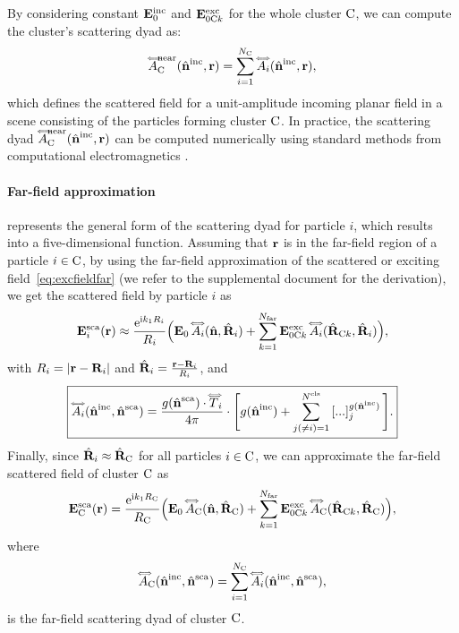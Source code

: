 By considering constant $\mathbf{E}^\mathrm{inc}_0$ and $\mathbf{E}^\mathrm{exc}_{0\mathrm{C} k}$ for the whole cluster $\mathrm{C}$, we can compute the cluster's scattering dyad as:
\begin{equation}
    {\accentset{\Longleftrightarrow}{A}}_{\mathrm{C}}^\text{near}({\hat{\mathbf{n}}}^\mathrm{inc},\mathbf{r}) = \sum_{i=1}^{N_{\mathrm{C}}} {\accentset{\Longleftrightarrow}{A}}_i({\hat{\mathbf{n}}}^\mathrm{inc},\mathbf{r}),
    \label{eq:scatdyadcluster_near}
\end{equation}
which defines the scattered field for a unit-amplitude incoming planar field in a scene consisting of the particles forming cluster $\mathrm{C}$.
In practice, the scattering dyad ${\accentset{\Longleftrightarrow}{A}}_{\mathrm{C}}^\text{near}({\hat{\mathbf{n}}}^\mathrm{inc},\mathbf{r})$ can be computed numerically using standard methods from computational electromagnetics \cite{mishchenko2014electromagnetic}.


\paragraph{Far-field approximation}
 represents the general form of the scattering dyad for particle $i$, which results into a five-dimensional function. Assuming that $\mathbf{r}$ is in the far-field region of a particle $i\in\mathrm{C}$, by using the far-field approximation of the scattered or exciting field~\eqref{eq:excfieldfar} (we refer to the supplemental document for the derivation), we get the scattered field by particle $i$ as
\begin{align}
    \mathbf{E}^\mathrm{sca}_i(\mathbf{r}) \approx \frac{\mathrm{e}^{\mathrm{i} k_1 R_i}}{R_i} \Big(\mathbf{E}_0 \,  {\accentset{\Longleftrightarrow}{A}}_i(\hat{\mathbf{n}},\hat{\mathbf{R}}_i) 
    + \sum_{k=1}^{N_\mathrm{far}} \mathbf{E}^\mathrm{exc}_{0\mathrm{C} k} \, {\accentset{\Longleftrightarrow}{A}}_i(\hat{\mathbf{R}}_{\mathrm{C} k},\hat{\mathbf{R}}_i) \Big),
    \label{eq:farscatfield}
\end{align}
with $R_i=|\mathbf{r}-\mathbf{R}_i|$ and $\hat{\mathbf{R}}_i=\frac{\mathbf{r}-\mathbf{R}_i}{R_i}$, and
\begin{equation}
    \label{eq:farscatdyad}
    \boxed{%
        \dyad{A}_i(\hatbfnis) = \frac{g(\hatbfns)\cdot \dyad{T}_i}{4\pi} \cdot\Bigg[ g(\hatbfni) + \sum_{j(\neq i)=1}^{\Ncls} \left[...\right]_j^{g(\hatbfni)} \Bigg].
    }
\end{equation}
Finally, since $\hat{\mathbf{R}}_i\approx\hat{\mathbf{R}}_{\mathrm{C}}$ for all particles $i\in\mathrm{C}$, we can approximate the far-field scattered field of cluster $\mathrm{C}$ as
\begin{equation}
    \mathbf{E}^\mathrm{sca}_{\mathrm{C}}(\mathbf{r}) = \frac{\mathrm{e}^{\mathrm{i} k_1 R_{\mathrm{C}}}}{R_{\mathrm{C}}}\Big( \mathbf{E}_0 \,  {\accentset{\Longleftrightarrow}{A}}_{\mathrm{C}}(\hat{\mathbf{n}},\hat{\mathbf{R}}_{\mathrm{C}}) + \sum_{k=1}^{N_\mathrm{far}} \mathbf{E}^\mathrm{exc}_{0\mathrm{C} k} \, {\accentset{\Longleftrightarrow}{A}}_{\mathrm{C}}(\hat{\mathbf{R}}_{\mathrm{C} k},\hat{\mathbf{R}}_{\mathrm{C}}) \Big),
    \label{eq:farscatfieldcluster}
\end{equation}
where
\begin{equation}
   {\accentset{\Longleftrightarrow}{A}}_{\mathrm{C}}({\hat{\mathbf{n}}}^\mathrm{inc},{\hat{\mathbf{n}}}^\mathrm{sca}) = \sum_{i=1}^{N_{\mathrm{C}}}{\accentset{\Longleftrightarrow}{A}}_i({\hat{\mathbf{n}}}^\mathrm{inc},{\hat{\mathbf{n}}}^\mathrm{sca}),
   \label{eq:farscatdyadC}
\end{equation}
is the far-field scattering dyad of cluster $\mathrm{C}$.

